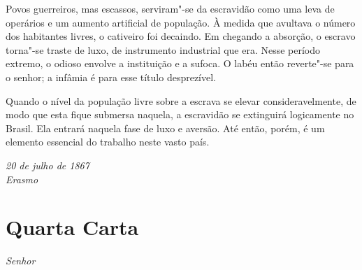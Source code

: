 \begin{linenumbers}
Povos guerreiros, mas escassos, serviram"-se da escravidão como uma
leva de operários e um aumento artificial de população. À medida que
avultava o número dos habitantes livres, o cativeiro foi decaindo. Em
chegando a absorção, o escravo torna"-se traste de luxo, de
instrumento industrial que era. Nesse período extremo, o odioso envolve
a instituição e a sufoca. O labéu então reverte"-se para o senhor; a
infâmia é para esse título desprezível.

Quando o nível da população livre sobre a escrava se elevar 		
consideravelmente, de modo que esta fique submersa naquela, a
escravidão se extinguirá logicamente no Brasil. Ela entrará naquela
fase de luxo e aversão. Até então, porém, é um elemento essencial do
trabalho neste vasto país.

\end{linenumbers}

\begin{flushright}
\textit{20 de julho de 1867\\ 
Erasmo}
\end{flushright}

\chapter[Quarta Carta]{Quarta Carta }


\noindent\textit{Senhor}

\setcounter{@sectionNumCenter}{0}

\sectionitem

